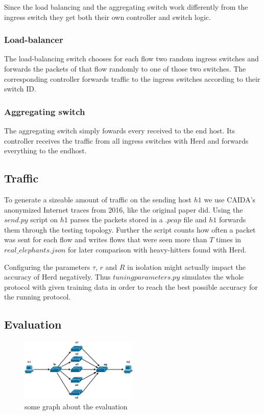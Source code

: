 \documentclass[11pt,oneside,a4paper]{article}
\begin{document}
Since the load balancing and the aggregating switch work differently from the ingress switch they get both their own controller and switch logic.

\subsubsection{Load-balancer}
The load-balancing switch chooses for each flow two random ingress switches and forwards the packets of that flow randomly to one of those two switches.
The corresponding controller forwards traffic to the ingress switches according to their switch ID.

\subsubsection{Aggregating switch}
The aggregating switch simply fowards every received to the end host.
Its controller receives the traffic from all ingress switches with Herd and forwards everything to the endhost.

\subsection{Traffic} \label{traffic}
To generate a sizeable amount of traffic on the sending host $h1$ we use CAIDA's anonymized Internet traces from 2016, like the original paper did. Using the $send.py$ script on $h1$ parses the packets stored in a $.pcap$ file and $h1$ forwards them through the testing topology. Further the script counts how often a packet was sent for each flow and writes flows that were seen more than $T$ times in $real\_elephants.json$ for later comparison with heavy-hitters found with Herd.

Configuring the parameters $\tau$, $r$ and $R$ in isolation might actually impact the accuracy of Herd negatively. Thus $tuningparameters.py$ simulates the whole protocol with given training data in order to reach the best possible accuracy for the running protocol.

\subsection{Evaluation} \label{evaluation}
\begin{figure}
	\centering
	\includegraphics[width=0.5\textwidth]{figures/Herd_topology}
	\caption{some graph about the evaluation}
	\label{fig:topology_fig}
\end{figure}
\end{document}
